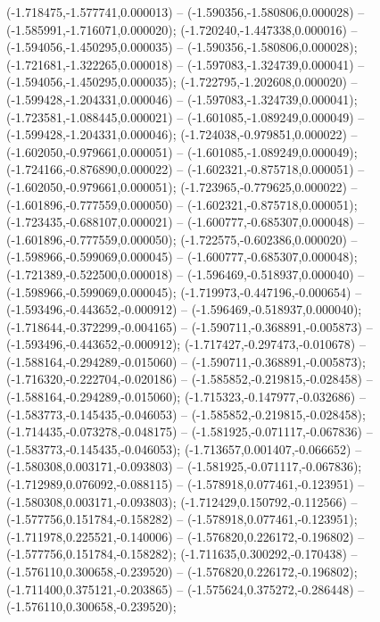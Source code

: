  (-1.718475,-1.577741,0.000013) -- (-1.590356,-1.580806,0.000028) -- (-1.585991,-1.716071,0.000020);
 (-1.720240,-1.447338,0.000016) -- (-1.594056,-1.450295,0.000035) -- (-1.590356,-1.580806,0.000028);
 (-1.721681,-1.322265,0.000018) -- (-1.597083,-1.324739,0.000041) -- (-1.594056,-1.450295,0.000035);
 (-1.722795,-1.202608,0.000020) -- (-1.599428,-1.204331,0.000046) -- (-1.597083,-1.324739,0.000041);
 (-1.723581,-1.088445,0.000021) -- (-1.601085,-1.089249,0.000049) -- (-1.599428,-1.204331,0.000046);
 (-1.724038,-0.979851,0.000022) -- (-1.602050,-0.979661,0.000051) -- (-1.601085,-1.089249,0.000049);
 (-1.724166,-0.876890,0.000022) -- (-1.602321,-0.875718,0.000051) -- (-1.602050,-0.979661,0.000051);
 (-1.723965,-0.779625,0.000022) -- (-1.601896,-0.777559,0.000050) -- (-1.602321,-0.875718,0.000051);
 (-1.723435,-0.688107,0.000021) -- (-1.600777,-0.685307,0.000048) -- (-1.601896,-0.777559,0.000050);
 (-1.722575,-0.602386,0.000020) -- (-1.598966,-0.599069,0.000045) -- (-1.600777,-0.685307,0.000048);
 (-1.721389,-0.522500,0.000018) -- (-1.596469,-0.518937,0.000040) -- (-1.598966,-0.599069,0.000045);
 (-1.719973,-0.447196,-0.000654) -- (-1.593496,-0.443652,-0.000912) -- (-1.596469,-0.518937,0.000040);
 (-1.718644,-0.372299,-0.004165) -- (-1.590711,-0.368891,-0.005873) -- (-1.593496,-0.443652,-0.000912);
 (-1.717427,-0.297473,-0.010678) -- (-1.588164,-0.294289,-0.015060) -- (-1.590711,-0.368891,-0.005873);
 (-1.716320,-0.222704,-0.020186) -- (-1.585852,-0.219815,-0.028458) -- (-1.588164,-0.294289,-0.015060);
 (-1.715323,-0.147977,-0.032686) -- (-1.583773,-0.145435,-0.046053) -- (-1.585852,-0.219815,-0.028458);
 (-1.714435,-0.073278,-0.048175) -- (-1.581925,-0.071117,-0.067836) -- (-1.583773,-0.145435,-0.046053);
 (-1.713657,0.001407,-0.066652) -- (-1.580308,0.003171,-0.093803) -- (-1.581925,-0.071117,-0.067836);
 (-1.712989,0.076092,-0.088115) -- (-1.578918,0.077461,-0.123951) -- (-1.580308,0.003171,-0.093803);
 (-1.712429,0.150792,-0.112566) -- (-1.577756,0.151784,-0.158282) -- (-1.578918,0.077461,-0.123951);
 (-1.711978,0.225521,-0.140006) -- (-1.576820,0.226172,-0.196802) -- (-1.577756,0.151784,-0.158282);
 (-1.711635,0.300292,-0.170438) -- (-1.576110,0.300658,-0.239520) -- (-1.576820,0.226172,-0.196802);
 (-1.711400,0.375121,-0.203865) -- (-1.575624,0.375272,-0.286448) -- (-1.576110,0.300658,-0.239520);
